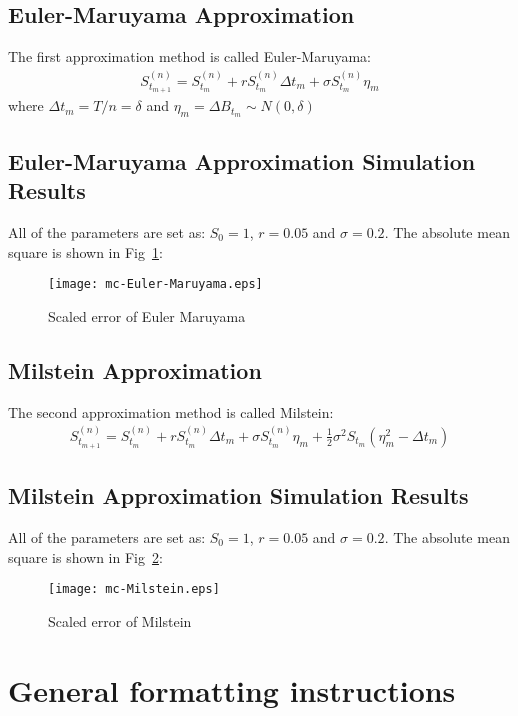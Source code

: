 \documentclass{article} %
\begin{document}
\subsection{Euler-Maruyama Approximation}
The first approximation method is called Euler-Maruyama:
\begin{align}
  S_{t_{m+1}}^{(n)}=S_{t_{m}}^{(n)}+rS_{t_{m}}^{(n)}\Delta t_{m}+\sigma S_{t_{m}}^{(n)}\eta_{m}
\end{align}
where $\Delta t_{m}=T/n=\delta$ and $\eta_{m}=\Delta B_{t_{m}}\sim N(0,\delta)$

\subsection{Euler-Maruyama Approximation Simulation Results}
All of the parameters are set as: $S_{0}=1$, $r=0.05$ and $\sigma=0.2$. The absolute mean square is shown in Fig~\ref{fig:1}:
\begin{figure}[htbp!]
  \centering
  \texttt{[image: mc-Euler-Maruyama.eps]}
  \caption{Scaled error of Euler Maruyama}
  \label{fig:1}
\end{figure}

\subsection{Milstein Approximation}
The second approximation method is called Milstein:
\begin{align}
  S_{t_{m+1}}^{(n)}=S_{t_{m}}^{(n)}+rS_{t_{m}}^{(n)}\Delta t_{m}+\sigma S_{t_{m}}^{(n)}\eta_{m}+\frac{1}{2}\sigma^{2}S_{t_{m}}(\eta_{m}^{2}-\Delta t_{m})
\end{align}

\subsection{Milstein Approximation Simulation Results}
All of the parameters are set as: $S_{0}=1$, $r=0.05$ and $\sigma=0.2$. The absolute mean square is shown in Fig~\ref{fig:2}:
\begin{figure}[htbp!]
  \centering
  \texttt{[image: mc-Milstein.eps]}
  \caption{Scaled error of Milstein}
  \label{fig:2}
\end{figure}

\section{General formatting instructions}
\label{gen_inst}
\end{document}
